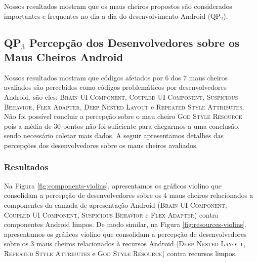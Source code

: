 \begin{square}
  \small
  Nossos resultados mostram que os maus cheiros propostos são considerados importantes e frequentes no dia a dia do desenvolvimento Android (QP$_2$).
\end{square}




\subsection{QP$_3$ Percepção dos Desenvolvedores sobre os Maus Cheiros Android}
\label{phase3-results}

Nossos resultados mostram que códigos afetados por 6 dos 7 maus cheiros avaliados são percebidos como códigos problemáticos por desenvolvedores Android, são eles: \textsc{\small Brain UI Component}, \textsc{\small Coupled UI Component}, \textsc{\small Suspicious Behavior}, \textsc{\small Flex Adapter}, \textsc{\small Deep Nested Layout} e \textsc{\small Repeated Style Attributes}. Não foi possível concluir a percepção sobre o mau cheiro \textsc{\small God Style Resource} pois a média de 30 pontos não foi suficiente para chegarmos a uma conclusão, sendo necessário coletar mais dados. A seguir apresentamos detalhes das percepções dos desenvolvedores sobre os maus cheiros avaliados.



\subsubsection{Resultados}
\label{sec:results-phase3}

Na Figura \ref{fig:components-violins}, apresentamos os gráficos violino que consolidam a percepção de desenvolvedores sobre os 4 maus cheiros relacionados a componentes da camada de apresentação Android (\textsc{\small Brain UI Component}, \textsc{\small Coupled UI Component}, \textsc{\small Suspicious Behavior} e \textsc{\small Flex Adapter}) contra componentes Android limpos. De modo similar, na Figura \ref{fig:resources-violins}, apresentamos os gráficos violino que consolidam a percepção de desenvolvedores sobre os 3 maus cheiros relacionados à recursos Android (\textsc{\small Deep Nested Layout}, \textsc{\small Repeated Style Attributes} e \textsc{\small God Style Resource}) contra recursos limpos.

